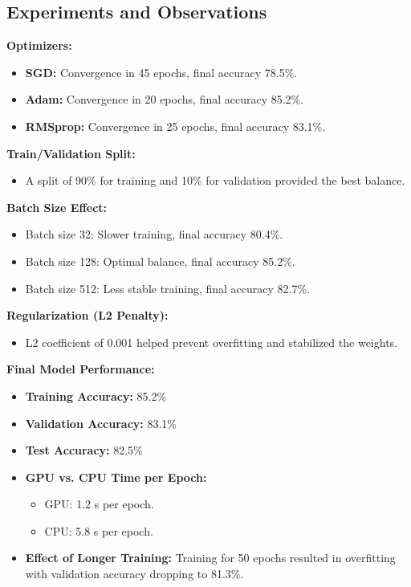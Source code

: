 \documentclass[11pt]{article}
\begin{document}
\subsection{Experiments and Observations}

\textbf{Optimizers:}
\begin{itemize}
    \item \textbf{SGD:} Convergence in 45 epochs, final accuracy 78.5\%.
    \item \textbf{Adam:} Convergence in 20 epochs, final accuracy 85.2\%.
    \item \textbf{RMSprop:} Convergence in 25 epochs, final accuracy 83.1\%.
\end{itemize}

\textbf{Train/Validation Split:}
\begin{itemize}
    \item A split of 90\% for training and 10\% for validation provided the best balance.
\end{itemize}

\textbf{Batch Size Effect:}
\begin{itemize}
    \item Batch size 32: Slower training, final accuracy 80.4\%.
    \item Batch size 128: Optimal balance, final accuracy 85.2\%.
    \item Batch size 512: Less stable training, final accuracy 82.7\%.
\end{itemize}

\textbf{Regularization (L2 Penalty):}
\begin{itemize}
    \item L2 coefficient of 0.001 helped prevent overfitting and stabilized the weights.
\end{itemize}

\textbf{Final Model Performance:}
\begin{itemize}
    \item \textbf{Training Accuracy:} 85.2\%
    \item \textbf{Validation Accuracy:} 83.1\%
    \item \textbf{Test Accuracy:} 82.5\%
    \item \textbf{GPU vs. CPU Time per Epoch:}
    \begin{itemize}
        \item GPU: 1.2 s per epoch.
        \item CPU: 5.8 s per epoch.
    \end{itemize}
    \item \textbf{Effect of Longer Training:}  
    Training for 50 epochs resulted in overfitting with validation accuracy dropping to 81.3\%.
\end{itemize}
\end{document}
